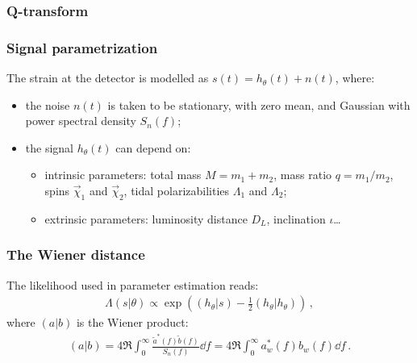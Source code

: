 \documentclass{beamer}
\begin{document}
\begin{frame}
    \frametitle{Q-transform}
    \begin{figure}[ht]
    \centering
    \label{fig:q_transform}
    \end{figure}
\end{frame}


\begin{frame}
    \frametitle{Signal parametrization}
    The strain at the detector is modelled as \(s(t) = h_\theta (t) + n(t)\), where:
    \begin{itemize}
        \item the noise \(n(t)\) is taken to be stationary, with zero mean, and Gaussian with power spectral density \(S_n(f)\);
        \item the signal \(h_\theta (t)\) can depend on: 
        \begin{itemize}
            \item intrinsic parameters: total mass \(M = m_1 + m_2 \), mass ratio \(q = m_1 / m_2 \), spins \(\vec{\chi}_{1}\) and \(\vec{\chi}_2\), tidal polarizabilities \(\Lambda_1\) and \(\Lambda_2 \);
            \item extrinsic parameters: luminosity distance \(D_L\), inclination \(\iota \)\dots
        \end{itemize}
    \end{itemize}
\end{frame}

\begin{frame}
    \frametitle{The Wiener distance}
    
    The likelihood used in parameter estimation reads:
    \begin{align}
        \Lambda (s | \theta ) \propto \exp( (h_\theta | s) - \frac{1}{2} (h_\theta | h_\theta ))
        \,,
    \end{align}
    where \((a | b)\) is the Wiener product: 
    \begin{align}
    (a | b) = 4 \Re \int_{0}^{\infty } \frac{\widetilde{a}^{*}(f) \widetilde{b} (f)}{S_n (f)} \dd{f}
    = 4 \Re \int_0^{ \infty } a_w^* (f) b_w(f) \dd{f}
    \,.
    \end{align}
\end{frame}
\end{document}
